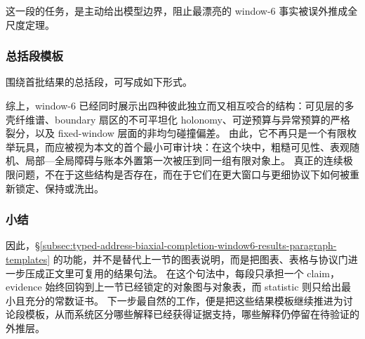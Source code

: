 这一段的任务，是主动给出模型边界，阻止最漂亮的 window-\(6\) 事实被误外推成全尺度定理。

\subsubsection{总括段模板}\label{subsubsec:typed-address-biaxial-completion-window6-results-summary-template}
围绕首批结果的总括段，可写成如下形式。

综上，window-\(6\) 已经同时展示出四种彼此独立而又相互咬合的结构：可见层的多壳纤维谱、boundary 扇区的不可平坦化 holonomy、可逆预算与异常预算的严格裂分，以及 fixed-window 层面的非均匀碰撞偏差。
由此，它不再只是一个有限枚举玩具，而应被视为本文的首个最小可审计块：在这个块中，粗糙可见性、表观随机、局部—全局障碍与账本外置第一次被压到同一组有限对象上。
真正的连续极限问题，不在于这些结构是否存在，而在于它们在更大窗口与更细协议下如何被重新锁定、保持或洗出。

\subsubsection{小结}\label{subsubsec:typed-address-biaxial-completion-window6-results-summary}
因此，\S\ref{subsec:typed-address-biaxial-completion-window6-results-paragraph-templates} 的功能，并不是替代上一节的图表说明，而是把图表、表格与协议门进一步压成正文里可复用的结果句法。
在这个句法中，每段只承担一个 claim，evidence 始终回钩到上一节已经锁定的对象图与对象表，而 statistic 则只给出最小且充分的常数证书。
下一步最自然的工作，便是把这些结果模板继续推进为讨论段模板，从而系统区分哪些解释已经获得证据支持，哪些解释仍停留在待验证的外推层。

